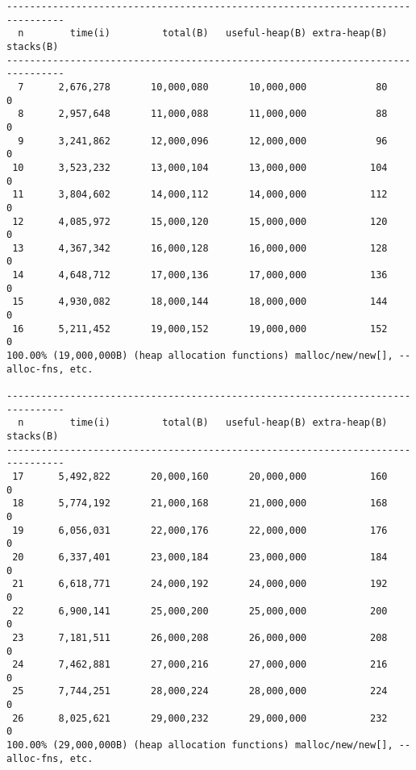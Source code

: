 \begin{lstlisting}
--------------------------------------------------------------------------------
  n        time(i)         total(B)   useful-heap(B) extra-heap(B)    stacks(B)
--------------------------------------------------------------------------------
  7      2,676,278       10,000,080       10,000,000            80            0
  8      2,957,648       11,000,088       11,000,000            88            0
  9      3,241,862       12,000,096       12,000,000            96            0
 10      3,523,232       13,000,104       13,000,000           104            0
 11      3,804,602       14,000,112       14,000,000           112            0
 12      4,085,972       15,000,120       15,000,000           120            0
 13      4,367,342       16,000,128       16,000,000           128            0
 14      4,648,712       17,000,136       17,000,000           136            0
 15      4,930,082       18,000,144       18,000,000           144            0
 16      5,211,452       19,000,152       19,000,000           152            0
100.00% (19,000,000B) (heap allocation functions) malloc/new/new[], --alloc-fns, etc.

--------------------------------------------------------------------------------
  n        time(i)         total(B)   useful-heap(B) extra-heap(B)    stacks(B)
--------------------------------------------------------------------------------
 17      5,492,822       20,000,160       20,000,000           160            0
 18      5,774,192       21,000,168       21,000,000           168            0
 19      6,056,031       22,000,176       22,000,000           176            0
 20      6,337,401       23,000,184       23,000,000           184            0
 21      6,618,771       24,000,192       24,000,000           192            0
 22      6,900,141       25,000,200       25,000,000           200            0
 23      7,181,511       26,000,208       26,000,000           208            0
 24      7,462,881       27,000,216       27,000,000           216            0
 25      7,744,251       28,000,224       28,000,000           224            0
 26      8,025,621       29,000,232       29,000,000           232            0
100.00% (29,000,000B) (heap allocation functions) malloc/new/new[], --alloc-fns, etc.


\end{lstlisting}
